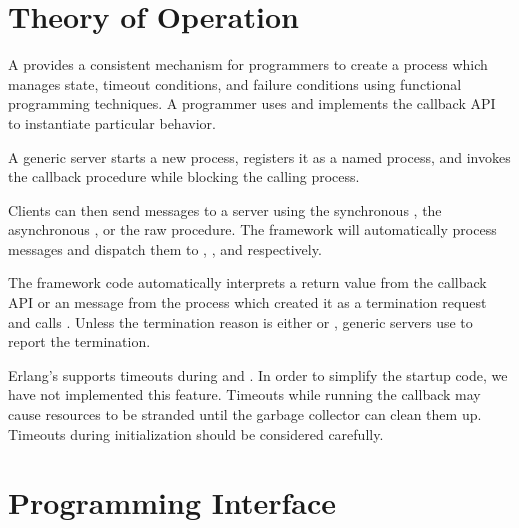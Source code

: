 \section {Theory of Operation}

A  provides a consistent mechanism for programmers
to create a process which manages state, timeout conditions, and
failure conditions using functional programming techniques. A
programmer uses  and implements the callback
API to instantiate particular behavior.

A generic server starts a new process, registers it as a named
process, and invokes the  callback procedure while
blocking the calling process.

Clients can then send messages to a server using the synchronous
, the asynchronous ,
or the raw  procedure. The  framework
will automatically process messages and dispatch them to
, , and 
respectively.

The  framework code automatically interprets a
 return value from the callback API or an 
message from the process which created it as a termination request and
calls . Unless the termination reason is either
 or , generic servers use
 to report the termination.

Erlang's  supports timeouts during
 and . In
order to simplify the startup code, we have not implemented this
feature. Timeouts while running the  callback may cause
resources to be stranded until the garbage collector can clean them
up. Timeouts during initialization should be considered carefully.

\section {Programming Interface}

\begin{syntax}
\end{syntax}
\returns{}

\begin{argtbl}
\end{argtbl}

